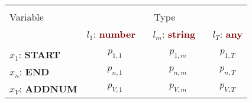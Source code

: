 \renewcommand{\arraystretch}{0.5}
\scriptsize
\begin{tabular}{@{}l@{\hskip 1mm} c@{\hskip 1mm} c@{\hskip 1mm} c@{}}
\toprule\\
Variable & \multicolumn{3}{c}{Type}\\ 
\cmidrule(l){2-4}
& $l_1$: \textbf{\textcolor{Maroon}{number}} \ & $l_m$: \textbf{\textcolor{Maroon}{string}} \ & $l_T$: \textbf{\textcolor{Maroon}{any}}\\ 
\midrule\\
$x_1$: \textbf{\textcolor{mygreen}{START}} & $p_{1,1}$ & $p_{1,m}$ & $p_{1,T}$\\
$x_n$: \textbf{\textcolor{mygreen}{END}} & $p_{n,1}$ & $p_{n,m}$ & $p_{n,T}$\\
$x_V$: \textbf{\textcolor{mygreen}{ADDNUM}} & $p_{V,1}$ & $p_{V,m}$ & $p_{V,T}$\\
\bottomrule
\end{tabular}